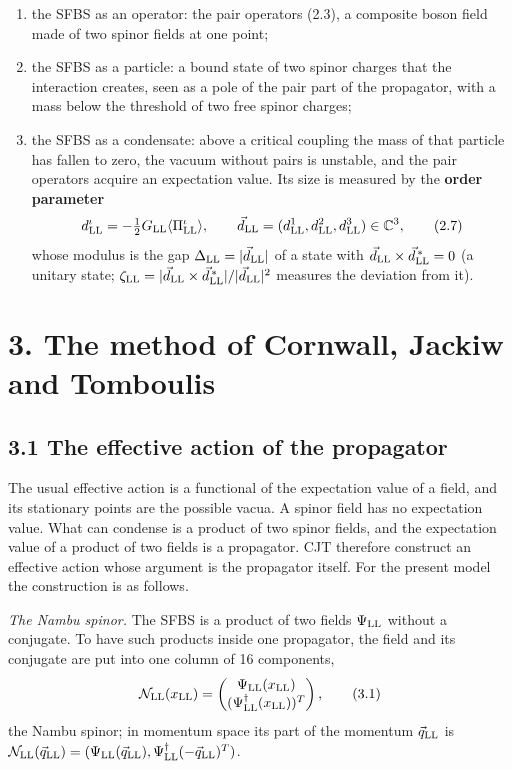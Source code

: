 \documentclass[
  10pt,
]{article}
\providecommand{\tightlist}{%
  \setlength{\itemsep}{0pt}\setlength{\parskip}{0pt}}
\begin{document}
\begin{enumerate}
\def\labelenumi{\arabic{enumi}.}
\tightlist
\item
  the SFBS as an operator: the pair operators (2.3), a composite boson
  field made of two spinor fields at one point;
\item
  the SFBS as a particle: a bound state of two spinor charges that the
  interaction creates, seen as a pole of the pair part of the
  propagator, with a mass below the threshold of two free spinor
  charges;
\item
  the SFBS as a condensate: above a critical coupling the mass of that
  particle has fallen to zero, the vacuum without pairs is unstable, and
  the pair operators acquire an expectation value. Its size is measured
  by the \textbf{order parameter}
  \[d^\iota_{\rm LL}=-\tfrac12G_{\rm LL}\langle\Pi^\iota_{\rm LL}\rangle,\qquad\vec d_{\rm LL}=(d^1_{\rm LL},d^2_{\rm LL},d^3_{\rm LL})\in\mathbb C^3,\tag{2.7}\]
  whose modulus is the gap
  \(\Delta_{\rm LL}=\lvert\vec d_{\rm LL}\rvert\) of a state with
  \(\vec d_{\rm LL}\times\vec d^{\,*}_{\rm LL}=0\) (a unitary state;
  \(\zeta_{\rm LL}=\lvert\vec d_{\rm LL}\times\vec d^{\,*}_{\rm LL}\rvert/\lvert\vec d_{\rm LL}\rvert^2\)
  measures the deviation from it).
\end{enumerate}

\hypertarget{the-method-of-cornwall-jackiw-and-tomboulis}{%
\section{3. The method of Cornwall, Jackiw and
Tomboulis}\label{the-method-of-cornwall-jackiw-and-tomboulis}}

\hypertarget{the-effective-action-of-the-propagator}{%
\subsection{3.1 The effective action of the
propagator}\label{the-effective-action-of-the-propagator}}

The usual effective action is a functional of the expectation value of a
field, and its stationary points are the possible vacua. A spinor field
has no expectation value. What can condense is a product of two spinor
fields, and the expectation value of a product of two fields is a
propagator. CJT therefore construct an effective action whose argument
is the propagator itself. For the present model the construction is as
follows.

\emph{The Nambu spinor.} The SFBS is a product of two fields
\(\Psi_{\rm LL}\) without a conjugate. To have such products inside one
propagator, the field and its conjugate are put into one column of 16
components,
\[\mathcal N_{\rm LL}(x_{\rm LL})=\begin{pmatrix}\Psi_{\rm LL}(x_{\rm LL})\\(\Psi^\dagger_{\rm LL}(x_{\rm LL}))^T\end{pmatrix},\tag{3.1}\]
the Nambu spinor; in momentum space its part of the momentum
\(\vec q_{\rm LL}\) is
\(\mathcal N_{\rm LL}(\vec q_{\rm LL})=(\Psi_{\rm LL}(\vec q_{\rm LL}),\Psi^\dagger_{\rm LL}(-\vec q_{\rm LL})^T)\).
\end{document}

